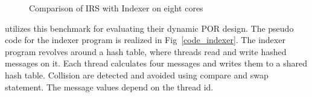 \begin{figure}[h]
     \centering
     \caption{Comparison of IRS with Indexer on eight cores}
\end{figure}

\citet{dynamic_por} utilizes this benchmark for evaluating their dynamic POR design. 
The pseudo code for the indexer program is realized in Fig~\ref{code_indexer}.  
The indexer program revolves around a hash table, where threads read and write hashed messages on it. 
Each thread calculates four messages and writes them to a shared hash table. 
Collision are detected and avoided using compare and swap statement. 
The message values depend on the thread id. 

